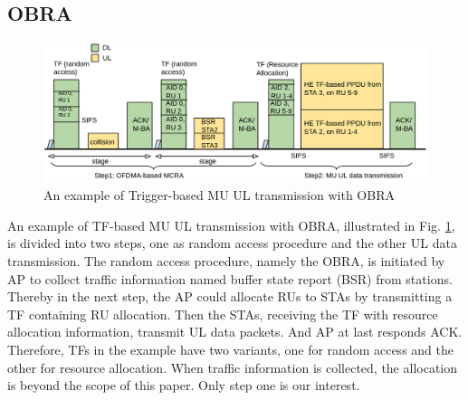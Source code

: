 \documentclass[journal]{IEEEtran}
\begin{document}



\subsection{OBRA}		\label{sec_RA_illu}

\begin{figure}[!ht]
\centering
\includegraphics[scale=0.35]{./figure/Section_preliminary/fig_RA_UL.png}
\caption{An example of Trigger-based MU UL transmission with OBRA}
\label{fig_ra_ul}
\end{figure}



An example of TF-based MU UL transmission with OBRA, illustrated in Fig. \ref{fig_ra_ul}, is divided into two steps, one as random access procedure and the other UL data transmission.
The random access procedure, namely the OBRA, is initiated by AP to collect traffic information named buffer state report (BSR) from stations. 
Thereby in the next step, the AP could allocate RUs to STAs by transmitting a TF containing RU allocation.
Then the STAs, receiving the TF with resource allocation information, transmit UL data packets. And AP at last responds ACK.
Therefore, TFs in the example have two variants, one for random access and the other for resource allocation. 
When traffic information is collected, the allocation is beyond the scope of this paper. Only step one is our interest.
\end{document}
